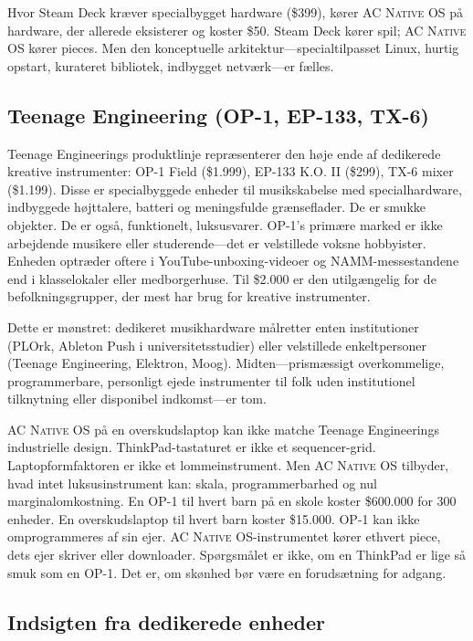 \documentclass[10pt,letterpaper,twocolumn]{article}
\newcommand{\acos}{\textsc{AC Native OS}}
\begin{document}
Hvor Steam Deck kr{\ae}ver specialbygget hardware (\$399), k{\o}rer \acos{} p{\aa} hardware, der allerede eksisterer og koster \$50. Steam Deck k{\o}rer spil; \acos{} k{\o}rer pieces. Men den konceptuelle arkitektur---specialtilpasset Linux, hurtig opstart, kurateret bibliotek, indbygget netv{\ae}rk---er f{\ae}lles.

\subsection{Teenage Engineering (OP-1, EP-133, TX-6)}

Teenage Engineerings produktlinje repr{\ae}senterer den h{\o}je ende af dedikerede kreative instrumenter: OP-1 Field (\$1.999), EP-133 K.O. II (\$299), TX-6 mixer (\$1.199). Disse er specialbyggede enheder til musikskabelse med specialhardware, indbyggede h{\o}jttalere, batteri og meningsfulde gr{\ae}nseflader. De er smukke objekter. De er ogs{\aa}, funktionelt, luksusvarer. OP-1's prim{\ae}re marked er ikke arbejdende musikere eller studerende---det er velstillede voksne hobbyister. Enheden optr{\ae}der oftere i YouTube-unboxing-videoer og NAMM-messestandene end i klasselokaler eller medborgerhuse. Til \$2.000 er den utilg{\ae}ngelig for de befolkningsgrupper, der mest har brug for kreative instrumenter.

Dette er m{\o}nstret: dedikeret musikhardware m{\aa}lretter enten institutioner (PLOrk, Ableton Push i universitetsstudier) eller velstillede enkeltpersoner (Teenage Engineering, Elektron, Moog). Midten---prism{\ae}ssigt overkommelige, programmerbare, personligt ejede instrumenter til folk uden institutionel tilknytning eller disponibel indkomst---er tom.

\acos{} p{\aa} en overskudslaptop kan ikke matche Teenage Engineerings industrielle design. ThinkPad-tastaturet er ikke et sequencer-grid. Laptopformfaktoren er ikke et lomme\-instrument. Men \acos{} tilbyder, hvad intet luksusinstrument kan: skala, programmerbarhed og nul marginalomkostning. En OP-1 til hvert barn p{\aa} en skole koster \$600.000 for 300 enheder. En overskudslaptop til hvert barn koster \$15.000. OP-1 kan ikke omprogrammeres af sin ejer. \acos{}-instrumentet k{\o}rer ethvert piece, dets ejer skriver eller downloader. Sp{\o}rgsm{\aa}let er ikke, om en ThinkPad er lige s{\aa} smuk som en OP-1. Det er, om sk{\o}nhed b{\o}r v{\ae}re en foruds{\ae}tning for adgang.

\subsection{Indsigten fra dedikerede enheder}
\end{document}
